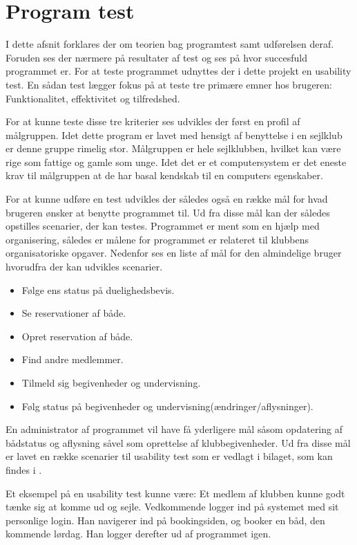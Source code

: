\chapter{Program test}
I dette afsnit forklares der om teorien bag programtest samt udførelsen deraf. Foruden ses der nærmere på resultater af test og ses på hvor succesfuld programmet er. For at teste programmet udnyttes der i dette projekt en usability test. En sådan test lægger fokus på at teste tre primære emner hos brugeren: Funktionalitet, effektivitet og tilfredshed. 

For at kunne teste disse tre kriterier ses udvikles der først en profil af målgruppen. Idet dette program er lavet med hensigt af benyttelse i en sejlklub er denne gruppe rimelig stor. Målgruppen er hele sejlklubben, hvilket kan være rige som fattige og gamle som unge. Idet det er et computersystem er det eneste krav til målgruppen at de har basal kendskab til en computers egenskaber.

For at kunne udføre en test udvikles der således også en række mål for hvad brugeren ønsker at benytte programmet til. Ud fra disse mål kan der således opstilles scenarier, der kan testes. Programmet er ment som en hjælp med organisering, således er målene for programmet er relateret til klubbens organisatoriske opgaver. Nedenfor ses en liste af mål for den almindelige bruger hvorudfra der kan udvikles scenarier.
\begin{itemize}
  \item Følge ens status på duelighedsbevis.
  \item Se reservationer af både.
  \item Opret reservation af  både.
  \item Find andre medlemmer.
  \item Tilmeld sig begivenheder og undervisning.
  \item Følg status på begivenheder og undervisning(ændringer/aflysninger).
\end{itemize}
En administrator af programmet vil have få yderligere mål såsom opdatering af bådstatus og aflysning såvel som oprettelse af klubbegivenheder. Ud fra disse mål er lavet en række scenarier til usability test som er vedlagt i bilaget, som kan findes i . 

Et eksempel på en usability test kunne være: Et medlem af klubben kunne godt tænke sig at komme ud og sejle. Vedkommende logger ind på systemet med sit personlige login. Han navigerer ind på bookingsiden, og booker en båd, den kommende lørdag. Han logger derefter ud af programmet igen.

